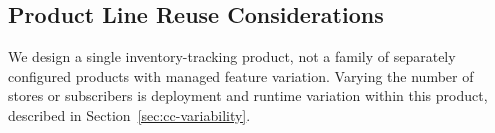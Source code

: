 \subsection{Product Line Reuse Considerations}
\label{sec:product-line}
\begin{notapplicable}
We design a single inventory-tracking product, not a family of separately configured
products with managed feature variation. Varying the number of stores or subscribers
is deployment and runtime variation within this product, described in
Section~\ref{sec:cc-variability}.
\end{notapplicable}
